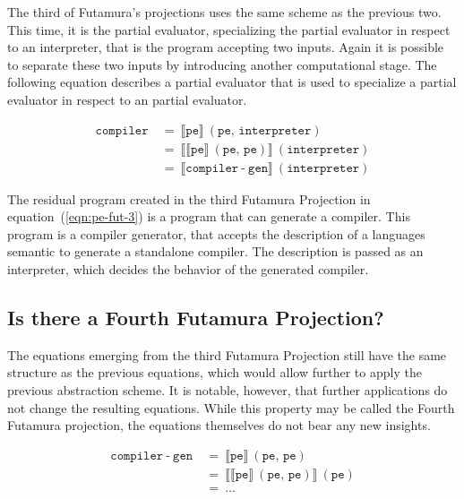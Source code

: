 The third of Futamura's projections uses the same scheme as the previous two.
This time, it is the partial evaluator, specializing the partial evaluator in respect to an interpreter, that is the program accepting two inputs.
Again it is possible to separate these two inputs by introducing another computational stage.
The following equation describes a partial evaluator that is used to specialize a partial evaluator in respect to an partial evaluator.

\begin{align}
  \mathtt{compiler}\
  &=\ \llbracket \mathtt{pe} \rrbracket \ (\mathtt{pe},\, \mathtt{interpreter}) \\
  &=\ \llbracket \llbracket \mathtt{pe} \rrbracket \ (\mathtt{pe},\, \mathtt{pe}) \rrbracket \ (\mathtt{interpreter}) \label{eqn:pe-fut-3}\\
  &=\ \llbracket \mathtt{compiler\operatorname{-}gen} \rrbracket \ (\mathtt{interpreter})
\end{align}

The residual program created in the third Futamura Projection in equation~(\ref{eqn:pe-fut-3}) is a program that can generate a compiler.
This program is a compiler generator, that accepts the description of a languages semantic to generate a standalone compiler.
The description is passed as an interpreter, which decides the behavior of the generated compiler.


\subsection{Is there a Fourth Futamura Projection?}\label{sec:futamura-fourth}

The equations emerging from the third Futamura Projection still have the same structure as the previous equations, which would allow further to apply the previous abstraction scheme.
It is notable, however, that further applications do not change the resulting equations.
While this property may be called the Fourth Futamura projection, the equations themselves do not bear any new insights.

\begin{align}
  \mathtt{compiler\operatorname{-}gen}\
  &=\ \llbracket \mathtt{pe} \rrbracket \ (\mathtt{pe},\, \mathtt{pe}) \\
  &=\ \llbracket \llbracket \mathtt{pe} \rrbracket \ (\mathtt{pe},\, \mathtt{pe}) \rrbracket \ (\mathtt{pe}) \\
  &=\ \ldots \nonumber
\end{align}



